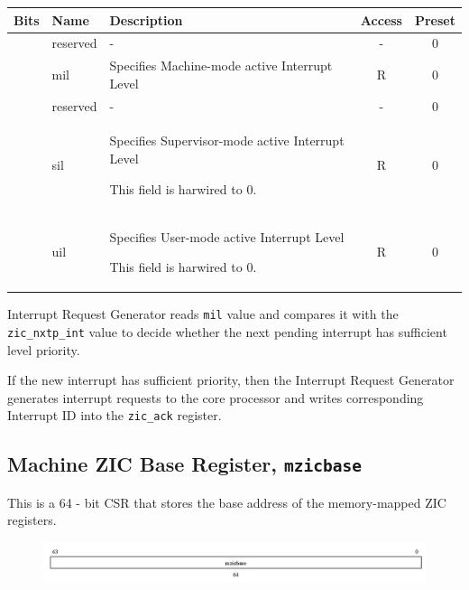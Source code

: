 \vspace{0.5cm}
\begin{table}[H]
    \label{tab:csr_mintstatus}
        \centering
        \begin{tabular}{l l p{8cm} c c}
         \hline 
         \textbf{Bits} & \textbf{Name} & \textbf{Description} & \textbf{Access} & \textbf{Preset}\\ \hline \hline
         [63:32] & reserved & - & - & 0\\ \hline
         [31:24] & mil & Specifies Machine-mode active Interrupt Level & R & 0\\ \hline
         [23:16] & reserved & - & - & 0\\ \hline
         [15:8] & sil & Specifies Supervisor-mode active Interrupt Level
         
         This field is harwired to 0. & R & 0\\ \hline
         [7:0] & uil & Specifies User-mode active Interrupt Level
         
         This field is harwired to 0. & R & 0\\ \hline
        \end{tabular}
\end{table}
\vspace{0.5cm}

Interrupt Request Generator reads \texttt{mil} value and compares it with the \linebreak \texttt{zic\_nxtp\_int} value to decide whether the next pending interrupt has sufficient level priority. 

If the new interrupt has sufficient priority, then the Interrupt Request Generator generates interrupt requests to the core processor and writes corresponding Interrupt ID into the \texttt{zic\_ack} register.


\subsection{Machine ZIC Base Register, \texttt{mzicbase}}
\label{subsec:mzicbase}

This is a 64 - bit  CSR that stores the base address of the memory-mapped ZIC registers.

\vspace{0.5cm}
\begin{figure}[H]
    \centering
    \includegraphics[width = 15.25cm]{images/csr_mzicbase.png}
    \label{fig:csr_mzicbase}
\end{figure}
\vspace{0.25cm}

